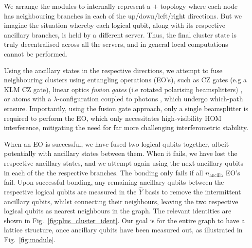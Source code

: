 \documentclass[aps,rmp,twocolumn,amsmath,amssymb,nofootinbib,superscriptaddress]{revtex4}
\begin{document}
We arrange the modules to internally represent a $+$ topology where each node has neighbouring branches in each of the up/down/left/right directions. But we imagine the situation whereby each logical qubit, along with its respective ancillary branches, is held by a different server. Thus, the final cluster state is truly decentralised across all the servers, and in general local computations cannot be performed.

Using the ancillary states in the respective directions, we attempt to fuse neighbouring clusters using entangling operations (EO's), such as CZ gates (e.g a KLM CZ gate), linear optics \emph{fusion gates} (i.e rotated polarising beamsplitters) \cite{???}, or atoms with a $\lambda$-configuration coupled to photons \cite{barrett}, which undergo which-path erasure. Importantly, using the fusion gate approach, only a single beamsplitter is required to perform the EO, which only necessitates high-visibility HOM \cite{HOM} interference, mitigating the need for far more challenging interferometric stability.

When an EO is successful, we have fused two logical qubits together, albeit potentially with ancillary states between them. When it fails, we have lost the respective ancillary states, and we attempt again using the next ancillary qubits in each of the the respective branches. The bonding only fails if all $n_\mathrm{ancilla}$ EO's fail. Upon successful bonding, any remaining ancillary qubits between the respective logical qubits are measured in the $\hat{Y}$ basis to remove the intermittent ancillary qubits, whilst connecting their neighbours, leaving the two respective logical qubits as nearest neighbours in the graph. The relevant identities are shown in Fig.~\ref{fig:plus_cluster_ident}. Our goal is for the entire graph to have a lattice structure, once ancillary qubits have been measured out, as illustrated in Fig.~\ref{fig:module}.
\end{document}
